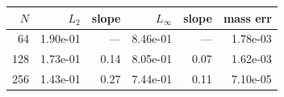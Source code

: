 \begin{tabular}{rrrrrr}
\toprule
$N$ & $L_2$ & slope & $L_\infty$ & slope & mass err \\
\midrule
64 & 1.90e-01 & --- & 8.46e-01 & --- & 1.78e-03 \\
128 & 1.73e-01 & 0.14 & 8.05e-01 & 0.07 & 1.62e-03 \\
256 & 1.43e-01 & 0.27 & 7.44e-01 & 0.11 & 7.10e-05 \\
\bottomrule
\end{tabular}
